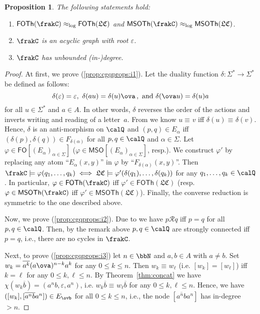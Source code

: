 \documentclass[a4paper,numberwithinsect,USenglish]{lipics-v2018}
\theoremstyle{plain}
\newtheorem{proposition}[theorem]{Proposition}
\theoremstyle{remark}
\newcommand{\ov}[1]{\overline{#1}}
\newcommand{\classfont}[1]{\mathsf{#1}}
\newcommand{\equivx}[1][]{\equiv_{#1}}
\newcommand{\Qx}{\calQ}
\newcommand{\chr}[1]{\chi(#1)}
\newcommand{\FO}{\classfont{FO}}
\newcommand{\MSO}{\classfont{MSO}}
\newcommand{\FOQ}{\FO[(E_\alpha)_{\alpha\in\varSigma}]}
\newcommand{\MSOQ}{\MSO[(E_\alpha)_{\alpha\in\varSigma}]}
\newcommand{\cQ}{\frakC}
\newcommand{\lcQ}{\mathfrak{LC}}
\newcommand{\FOTh}[1]{\classfont{FOTh}(#1)}
\newcommand{\MSOTh}[1]{\classfont{MSOTh}(#1)}
\newcommand{\grR}{\mathcal{R}}
\newcommand{\eqlog}{\approx_{\operatorname{log}}}
\renewcommand{\phi}{\varphi}
\begin{document}
\begin{proposition}\label{prop:cgqprops}
	The following statements hold:
	\begin{enumerate}[(1)]
		\item $\FOTh{\cQ}\eqlog\FOTh{\lcQ}$ and $\MSOTh{\cQ}\eqlog\MSOTh{\lcQ}$.\label{prop:cgqprops:i1}
		\item $\cQ$ is an acyclic graph with root $\varepsilon$.\label{prop:cgqprops:i2}
		\item $\cQ$ has unbounded (in-)degree.\label{prop:cgqprops:i3}
	\end{enumerate}
\end{proposition}
\begin{proof}
	At first, we prove (\ref{prop:cgqprops:i1}). Let the duality function $\delta\colon\varSigma^*\to\varSigma^*$ be defined as follows:
	\[\delta(\varepsilon)=\varepsilon,\ \delta(au)=\delta(u)\ova\,,\text{ and }\delta(\ova u)=\delta(u)a\]
	for all $u\in\varSigma^*$ and $a\in A$. In other words, $\delta$ reverses the order of the actions and inverts writing and reading of a letter~$a$. From \cite[Proposition~3.4]{HusKZ17} we know $u\equivx v$ iff $\delta(u)\equivx\delta(v)$. Hence, $\delta$ is an anti-morphism on $\Qx$ and $(p,q)\in E_\alpha$ iff $(\delta(p),\delta(q))\in F_{\delta(\alpha)}$ for all $p,q\in\Qx$ and $\alpha\in\varSigma$. Let $\phi\in\FOQ$ ($\phi\in\MSOQ$, resp.). We construct $\phi'$ by replacing any atom ``$E_\alpha(x,y)$'' in $\phi$ by ``$F_{\delta(\alpha)}(x,y)$''. Then
	$\cQ\models\phi(q_1,\dots,q_k) \iff \lcQ\models\phi'(\delta(q_1),\dots,\delta(q_k))$ for any $q_1,\dots,q_k\in\Qx$. In particular, $\phi\in\FOTh{\cQ}$ iff $\phi'\in\FOTh{\lcQ}$ (resp. $\phi\in\MSOTh{\cQ}$ iff $\phi'\in\MSOTh{\lcQ}$). Finally, the converse reduction is symmetric to the one described above.
	
	Now, we prove (\ref{prop:cgqprops:i2}). Due to \cite[Corollary~4.7]{HusKZ17} we have $p\grR q$ iff $p=q$ for all $p,q\in\Qx$. Then, by the remark above $p,q\in\Qx$ are strongly connected iff $p=q$, i.e., there are no cycles in $\cQ$.
	
	Next, to prove (\ref{prop:cgqprops:i3}) let $n\in\bbN$ and $a,b\in A$ with $a\neq b$. Set $w_k=\ov{a^k}(a\ova)^{n-k}a^k$ for any $0\leq k\leq n$. Then $w_k\equivx w_\ell$ (i.e. $[w_k]=[w_\ell]$) iff $k=\ell$ for any $0\leq k,\ell\leq n$. By Theorem~\ref{thm:concat} we have $\chr{w_k\ov{b}}=(a^nb,\varepsilon,a^n)$, i.e. $w_k\ov{b}\equivx w_\ell\ov{b}$ for any $0\leq k,\ell\leq n$. Hence, we have $([w_k],[\ov{a^nb}a^n])\in E_{\ovb}$ for all $0\leq k\leq n$, i.e., the node $[\ov{a^nb}a^n]$ has in-degree $>n$.
\end{proof}
\end{document}
